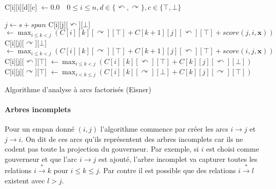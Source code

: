 \documentclass[11pt,openany]{book}
\begin{document}
\begin{algorithm}[htbp]

\scriptsize
\begin{algorithmic}[0]
\State C[i][i][d][c] $\gets 0.0 \quad 0 \leq i \leq n, d\in
\{\curvearrowleft, \curvearrowright\}, c \in \{\top,\bot \}$ 

     \State $j \gets s + span$
     \State{}
     \State C[i][j][$\curvearrowleft$][$\bot$] $\gets \mathop{\text{max}}_{i\leq k < j}(C[i][k][\curvearrowright][\top] + C[k+1][j][\curvearrowleft][\top] + score(j,i,\mathbf{x}))$
     \State C[i][j][$\curvearrowright$][$\bot$] $\gets \mathop{\text{max}}_{i\leq k < j}(C[i][k][\curvearrowright][\top] + C[k+1][j][\curvearrowleft][\top] + score(i,j,\mathbf{x}))$ 
     \State{}
     \State C[i][j][$\curvearrowleft$][$\top$] $\gets \mathop{\text{max}}_{i\leq k < j}(C[i][k][\curvearrowleft][\top] + C[k][j][\curvearrowleft][\bot])$     
     \State C[i][j][$\curvearrowright$][$\top$] $\gets \mathop{\text{max}}_{i < k \leq j}(C[i][k][\curvearrowright][\bot] + C[k][j][\curvearrowright][\top])$     

 \EndFor
\EndFor
\EndFunction
\end{algorithmic}

\caption{\label{algo-eisner}Algorithme d'analyse à arcs factorisés (Eisner)}
\end{algorithm}



\paragraph{Arbres incomplets}
Pour un empan donné $(i,j)$ l'algorithme commence par créer les arcs
$i\rightarrow j$ et $j\rightarrow i$. On dit de ces arcs qu'ils
représentent des arbres incomplets car ils ne codent pas toute la
projection du gouverneur. Par exemple, si $i$ est choisi comme
gouverneur et que l'arc $i\rightarrow j$ est ajouté,
l'arbre incomplet va capturer toutes les relations 
$i \stackrel{*}{\rightarrow} k$ pour $i\leq k \leq j$. Par contre il
est possible que des relations $i \stackrel{*}{\rightarrow} l$
existent avec $l > j$. 
\end{document}
